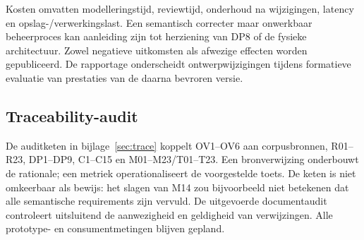 Kosten omvatten modelleringstijd, reviewtijd, onderhoud na wijzigingen, latency en opslag-/verwerkingslast. Een semantisch correcter maar onwerkbaar beheerproces kan aanleiding zijn tot herziening van DP8 of de fysieke architectuur. Zowel negatieve uitkomsten als afwezige effecten worden gepubliceerd. De rapportage onderscheidt ontwerpwijzigingen tijdens formatieve evaluatie van prestaties van de daarna bevroren versie.

\subsection{Traceability-audit}
De auditketen in bijlage~\ref{sec:trace} koppelt OV1--OV6 aan corpusbronnen, R01--R23, DP1--DP9, C1--C15 en M01--M23/T01--T23. Een bronverwijzing onderbouwt de rationale; een metriek operationaliseert de voorgestelde toets. De keten is niet omkeerbaar als bewijs: het slagen van M14 zou bijvoorbeeld niet betekenen dat alle semantische requirements zijn vervuld. De uitgevoerde documentaudit controleert uitsluitend de aanwezigheid en geldigheid van verwijzingen. Alle prototype- en consumentmetingen blijven gepland.
